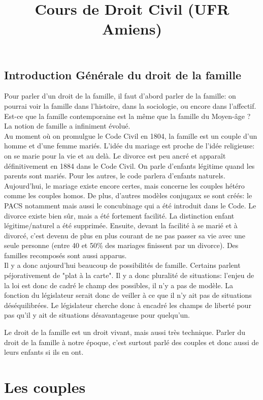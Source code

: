 \documentclass[12pt, a4paper, openany]{book}
\date{}
\title{Cours de Droit Civil (UFR Amiens)}
\begin{document}
\chapter{Introduction Générale du droit de la famille}

Pour parler d'un droit de la famille, il faut d'abord parler de la famille: on pourrai voir la famille dans l'histoire, dans la sociologie, ou encore dans l'affectif. Est-ce que la famille contemporaine est la même que la famille du Moyen-âge ? La notion de famille a infiniment évolué. \\
Au moment où on promulgue le Code Civil en 1804, la famille est un couple d'un homme et d'une femme mariés. L'idée du mariage est proche de l'idée religieuse: on se marie pour la vie et au delà. Le divorce est peu ancré et apparaît définitivement en 1884 dans le Code Civil. On parle d'enfants légitime quand les parents sont mariés. Pour les autres, le code parlera d'enfants naturels. \\
Aujourd'hui, le mariage existe encore certes, mais concerne les couples hétéro comme les couples homos. De plus, d'autres modèles conjugaux se sont créés: le PACS notamment mais aussi le concubinage qui a été introduit dans le Code. Le divorce existe bien sûr, mais a été fortement facilité.  La distinction enfant légitime/naturel a été supprimée. Ensuite, devant la facilité à se marié et à divorcé, c'est devenu de plus en plus courant de ne pas passer sa vie avec une seule personne (entre 40 et 50\% des mariages finissent par un divorce). Des familles recomposés sont aussi apparus. \\
Il y a donc aujourd'hui beaucoup de possibilités de famille. Certains parlent péjorativement de "plat à la carte". Il y a donc pluralité de situations: l'enjeu de la loi est donc de cadré le champ des possibles, il n'y a pas de modèle. La fonction du législateur serait donc de veiller à ce que il n'y ait pas de situations déséquilibrées. Le législateur cherche donc à encadré les champs de liberté pour pas qu'il y ait de situations désavantageuse pour quelqu'un.


Le droit de la famille est un droit vivant, mais aussi très technique. Parler du droit de la famille à notre époque, c'est surtout parlé des couples et donc aussi de leurs enfants si ils en ont. 

\part{Les couples}
\end{document}
